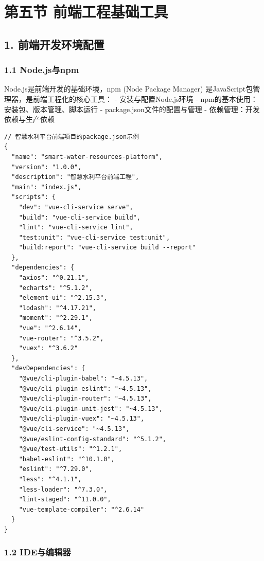 \section{第五节
前端工程基础工具}\label{ux7b2cux4e94ux8282-ux524dux7aefux5de5ux7a0bux57faux7840ux5de5ux5177}

\subsection{1.
前端开发环境配置}\label{ux524dux7aefux5f00ux53d1ux73afux5883ux914dux7f6e}

\subsubsection{1.1 Node.js与npm}\label{node.jsux4e0enpm}

Node.js是前端开发的基础环境，npm (Node Package Manager)
是JavaScript包管理器，是前端工程化的核心工具： - 安装与配置Node.js环境 -
npm的基本使用：安装包、版本管理、脚本运行 - package.json文件的配置与管理
- 依赖管理：开发依赖与生产依赖

\begin{lstlisting}
// 智慧水利平台前端项目的package.json示例
{
  "name": "smart-water-resources-platform",
  "version": "1.0.0",
  "description": "智慧水利平台前端工程",
  "main": "index.js",
  "scripts": {
    "dev": "vue-cli-service serve",
    "build": "vue-cli-service build",
    "lint": "vue-cli-service lint",
    "test:unit": "vue-cli-service test:unit",
    "build:report": "vue-cli-service build --report"
  },
  "dependencies": {
    "axios": "^0.21.1",
    "echarts": "^5.1.2",
    "element-ui": "^2.15.3",
    "lodash": "^4.17.21",
    "moment": "^2.29.1",
    "vue": "^2.6.14",
    "vue-router": "^3.5.2",
    "vuex": "^3.6.2"
  },
  "devDependencies": {
    "@vue/cli-plugin-babel": "~4.5.13",
    "@vue/cli-plugin-eslint": "~4.5.13",
    "@vue/cli-plugin-router": "~4.5.13",
    "@vue/cli-plugin-unit-jest": "~4.5.13",
    "@vue/cli-plugin-vuex": "~4.5.13",
    "@vue/cli-service": "~4.5.13",
    "@vue/eslint-config-standard": "^5.1.2",
    "@vue/test-utils": "^1.2.1",
    "babel-eslint": "^10.1.0",
    "eslint": "^7.29.0",
    "less": "^4.1.1",
    "less-loader": "^7.3.0",
    "lint-staged": "^11.0.0",
    "vue-template-compiler": "^2.6.14"
  }
}
\end{lstlisting}

\subsubsection{1.2 IDE与编辑器}\label{ideux4e0eux7f16ux8f91ux5668}

